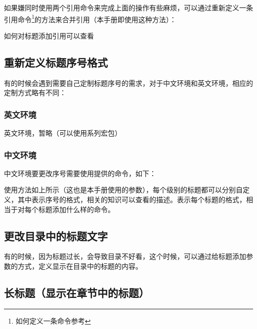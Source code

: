     如果嫌同时使用两个引用命令来完成上面的操作有些麻烦，可以通过重新定义一条引用命令\footnote{如何定义一条命令参考}的方法来合并引用（本手册即使用这种方法）：
    \begin{texcode}
        \newcommand{\Ref}[1]{\ref{#1}：\nameref{#1}}
    \end{texcode}

    \begin{texshow}
        如何对标题添加引用可以查看
    \end{texshow}
    
    
    \subsection{重新定义标题序号格式}
    有的时候会遇到需要自己定制标题序号的需求，对于中文环境和英文环境，相应的定制方式略有不同：

    \subsubsection{英文环境}
    英文环境，暂略（可以使用系列宏包）
    \subsubsection{中文环境}
    中文环境要更改序号需要使用提供的命令，如下：
    \begin{texcode}
    \end{texcode}
    使用方法如上所示（这也是本手册使用的参数），每个级别的标题都可以分别自定义，其中表示序号的格式，相关的知识可以查看的描述。表示每个标题的格式，相当于对每个标题添加什么样的命令。

    \subsection[更改目录标题]{更改目录中的标题文字}
    有的时候，因为标题过长，会导致目录不好看，这个时候，可以通过给标题添加参数的方式，定义显示在目录中的标题的内容。
    \begin{texcode}
        \section[短标题（显示在目录中的标题）]{长标题（显示在章节中的标题）}
    \end{texcode}

